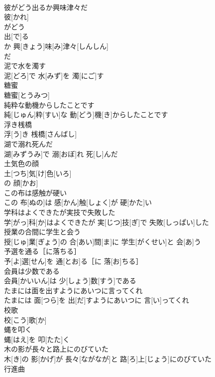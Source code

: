 \documentclass[8pt]{extreport}
\begin{document}
\begin{CJK}{UTF8}{min}
\\	彼がどう出るか興味津々だ	
\\	彼[かれ]
\\	がどう 
\\	出[で]る 
\\	か 興[きょう]味[み]津々[しんしん]
\\	だ
\\	泥で水を濁す	
\\	泥[どろ]で 水[みず]を 濁[にご]す
\\	糖蜜	
\\	糖蜜[とうみつ]
\\	純粋な動機からしたことです	
\\	純[じゅん]粋[すい]な 動[どう]機[き]からしたことです
\\	浮き桟橋	
\\	浮[う]き 桟橋[さんばし]
\\	湖で溺れ死んだ	
\\	湖[みずうみ]で 溺[おぼ]れ 死[し]んだ
\\	土気色の顔	
\\	土[つち]気[け]色[いろ]
\\	の 顔[かお]
\\	この布は感触が硬い	
\\	この 布[ぬの]は 感[かん]触[しょく]が 硬[かた]い
\\	学科はよくできたが実技で失敗した	
\\	学[がっ]科[か]はよくできたが 実[じつ]技[ぎ]で 失敗[しっぱい]した
\\	授業の合間に学生と会う	
\\	授[じゅ]業[ぎょう]の 合[あい]間[ま]に 学生[がくせい]と 会[あ]う
\\	予選を通る［に落ちる］	
\\	予[よ]選[せん]を 通[とお]る［に 落[お]ちる］
\\	会員は少数である	
\\	会員[かいいん]は 少[しょう]数[すう]である
\\	たまには面を出すようにあいつに言ってくれ	
\\	たまには 面[つら]を 出[だ]すようにあいつに 言[い]ってくれ
\\	校歌	
\\	校[こう]歌[か]
\\	蝿を叩く	
\\	蝿[はえ]を 叩[たた]く
\\	木の影が長々と路上にのびていた	
\\	木[き]の 影[かげ]が 長々[ながなが]と 路[ろ]上[じょう]にのびていた
\\	行進曲	

\end{CJK}
\end{document}
